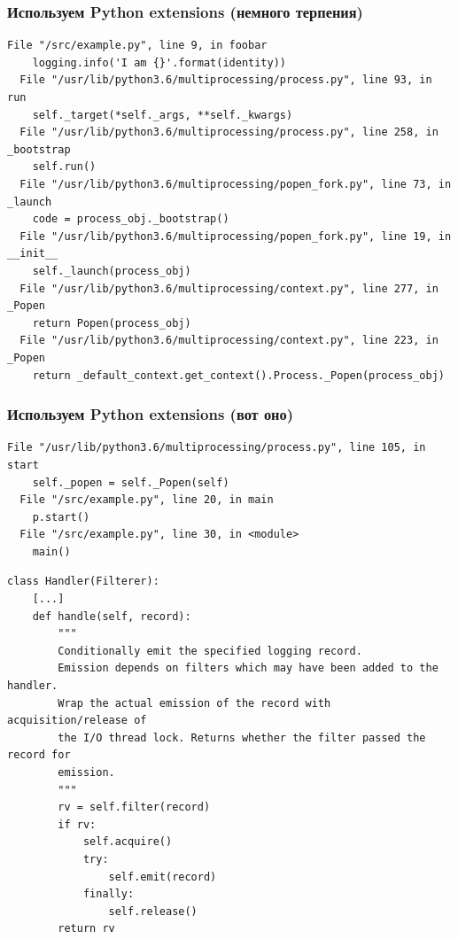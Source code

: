 \documentclass[10pt,pdf,utf8,aspectratio=169,xcolor=dvipsnames,x11names,center]{beamer}
\begin{document}
\begin{frame}[fragile]
  \frametitle{Используем Python extensions (немного терпения)}
  \begin{lstlisting}[language={}]
  File "/src/example.py", line 9, in foobar
    logging.info('I am {}'.format(identity))
  File "/usr/lib/python3.6/multiprocessing/process.py", line 93, in run
    self._target(*self._args, **self._kwargs)
  File "/usr/lib/python3.6/multiprocessing/process.py", line 258, in _bootstrap
    self.run()
  File "/usr/lib/python3.6/multiprocessing/popen_fork.py", line 73, in _launch
    code = process_obj._bootstrap()
  File "/usr/lib/python3.6/multiprocessing/popen_fork.py", line 19, in __init__
    self._launch(process_obj)
  File "/usr/lib/python3.6/multiprocessing/context.py", line 277, in _Popen
    return Popen(process_obj)
  File "/usr/lib/python3.6/multiprocessing/context.py", line 223, in _Popen
    return _default_context.get_context().Process._Popen(process_obj)
  \end{lstlisting}
\end{frame}

\begin{frame}[fragile]
  \frametitle{Используем Python extensions (вот оно)}
  \begin{lstlisting}[language={}]
  File "/usr/lib/python3.6/multiprocessing/process.py", line 105, in start
    self._popen = self._Popen(self)
  File "/src/example.py", line 20, in main
    p.start()
  File "/src/example.py", line 30, in <module>
    main()
  \end{lstlisting}
\end{frame}

\begin{frame}[fragile]
  \begin{lstlisting}[caption=logging/\_\_init\_\_.py\#L851-L867]
class Handler(Filterer):
    [...]
    def handle(self, record):
        """
        Conditionally emit the specified logging record.
        Emission depends on filters which may have been added to the handler.
        Wrap the actual emission of the record with acquisition/release of
        the I/O thread lock. Returns whether the filter passed the record for
        emission.
        """
        rv = self.filter(record)
        if rv:
            self.acquire()
            try:
                self.emit(record)
            finally:
                self.release()
        return rv
  \end{lstlisting}
\end{frame}
\end{document}
